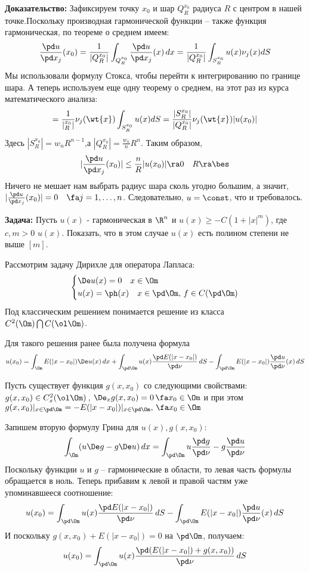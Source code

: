 \documentclass[a4paper,draft]{article}
\begin{document}
\textbf{Доказательство:} Зафиксируем точку $x_0$ и шар $Q_R^{x_0}$
радиуса $R$ с центром в нашей точке.Поскольку производная
гармонической функции -- также функция гармоническая, по теореме о
среднем имеем:
$$
\frac {\pd u}{\pd x_j}(x_0)=\frac 1{|Q_R^{x_0}|}
\int_{Q_R^{x_0}} \frac {\pd u}{\pd x_j}(x)\, dx= \frac
1{|Q_R^{x_0}|} \int_{S_R^{x_0}} u(x) \nu_j(x) dS
$$
Мы использовали формулу Стокса, чтобы перейти к интегрированию по
границе шара. А теперь используем еще одну теорему о среднем, на
этот раз из курса математического анализа:
$$
=\frac 1{|_R^{x_0}|} \nu_j(\wt{x}) \int_{S_R^{x_0}} u(x)
 dS=\frac{|S_R^{x_0}|}{|Q_R^{x_0}|} \nu_j(\wt{x}) |u(x_0)|
$$
Здесь $|S_R^{x_0}|=w_n R^{n-1}$,а $|Q_R^{x_0}|=\frac {w_n} n R^n$.
Таким образом,
$$
|\frac {\pd u}{\pd x_j}(x_0)|\le \frac n R
|u(x_0)|\ra 0 \quad R\ra\bes
$$
Ничего не мешает нам выбрать радиус шара сколь угодно большим, а
значит, $|\frac {\pd u}{\pd x_j}(x_0)|=0\quad \fa
j=1,\ldots,n$. Следовательно, $u=\const$, что и требовалось.

\textbf{Задача:} Пусть $u(x)$ - гармоническая в $\R^n$ и
$u(x)\ge -C(1+|x|^m)$, где $c,m>0$ $u(x)$. Показать, что в этом
случае $u(x)$ есть полином степени не выше $[m]$.

Рассмотрим задачу Дирихле для оператора Лапласа:
$$
 \left\{
\begin{aligned}
&\De u(x)=0\quad x\in\Om\\
&u(x)=\ph(x)\quad x\in \pd\Om,\,f\in C(\pd\Om)\\
\end{aligned}
\right.
$$
Под классическим решением понимается решение из класса
$C^2(\Om)\bigcap C(\ol \Om)$.

Для такого решения ранее была получена формула
$$
u(x_0)=\int_\Om E(|x-x_0|) \De u(x)\, dx
+\int_{\pd\Om}u(x) \frac {\pd
E(|x-x_0|)}{\pd\nu}\, dS-\int_{\pd\Om} E(|x-x_0|)
\frac {\pd u}{\pd \nu}(x)\, dS
$$

Пусть существует функция $g(x,x_0)$ со следующими свойствами:\\
$g(x,x_0)\in C^2_x(\ol \Om)\,$,  $\De_x
g(x,x_0)=0\,\fa x_0 \in \Om$ и при этом $g(x,x_0)|_{x\in
\pd\Om}=-E(|x-x_0|)|_{x\in
\pd\Om},\,\fa x_0 \in \Om$

Запишем вторую формулу Грина для $u(x),g(x,x_0)$:
$$
\int_\Om (u\De g-g\De u )\, dx = \int_{\pd\Om} u
\frac{\pd g}{\pd \nu}-g \frac{\pd u}{\pd \nu}
$$
Поскольку функции $u$ и $g$ -- гармонические в области, то левая
часть формулы обращается в ноль. Теперь прибавим к левой и правой
частям уже упоминавшееся соотношение:
$$
u(x_0)=\int_{\pd\Om}u(x) \frac {\pd
E(|x-x_0|)}{\pd\nu}\, dS-\int_{\pd\Om} E(|x-x_0|)
\frac {\pd u}{\pd \nu}(x)\, dS
$$
И поскольку $g(x,x_0)+E(|x-x_0|)=0$ на $\pd\Om$, получаем:
$$
u(x_0)=\int_{\pd\Om}u(x)
\frac{\pd(E(|x-x_0|)+g(x,x_0))}{\pd\nu}\, dS
$$
\end{document}
